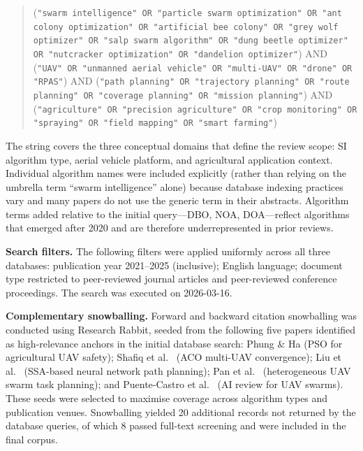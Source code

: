 \documentclass[review,3p,times]{elsarticle}
\begin{document}
\begin{quote}
\small
(\texttt{"swarm intelligence" OR "particle swarm optimization" OR "ant colony optimization"
OR "artificial bee colony" OR "grey wolf optimizer" OR "salp swarm algorithm"
OR "dung beetle optimizer" OR "nutcracker optimization" OR "dandelion optimizer"})
AND (\texttt{"UAV" OR "unmanned aerial vehicle" OR "multi-UAV" OR "drone" OR "RPAS"})
AND (\texttt{"path planning" OR "trajectory planning" OR "route planning"
OR "coverage planning" OR "mission planning"})
AND (\texttt{"agriculture" OR "precision agriculture" OR "crop monitoring"
OR "spraying" OR "field mapping" OR "smart farming"})
\end{quote}

The string covers the three conceptual domains that define the review scope: SI algorithm type, aerial vehicle platform, and agricultural application context. Individual algorithm names were included explicitly (rather than relying on the umbrella term ``swarm intelligence'' alone) because database indexing practices vary and many papers do not use the generic term in their abstracts. Algorithm terms added relative to the initial query---DBO, NOA, DOA---reflect algorithms that emerged after 2020 and are therefore underrepresented in prior reviews.

\textbf{Search filters.} The following filters were applied uniformly across all three databases: publication year 2021--2025 (inclusive); English language; document type restricted to peer-reviewed journal articles and peer-reviewed conference proceedings. The search was executed on 2026-03-16.

\textbf{Complementary snowballing.} Forward and backward citation snowballing was conducted using Research Rabbit, seeded from the following five papers identified as high-relevance anchors in the initial database search: Phung \& Ha \cite{phung2021} (PSO for agricultural UAV safety); Shafiq et al.\ \cite{shafiq2022} (ACO multi-UAV convergence); Liu et al.\ \cite{liu2021} (SSA-based neural network path planning); Pan et al.\ \cite{pan2022} (heterogeneous UAV swarm task planning); and Puente-Castro et al.\ \cite{puente2022} (AI review for UAV swarms). These seeds were selected to maximise coverage across algorithm types and publication venues. Snowballing yielded 20 additional records not returned by the database queries, of which 8 passed full-text screening and were included in the final corpus.
\end{document}
